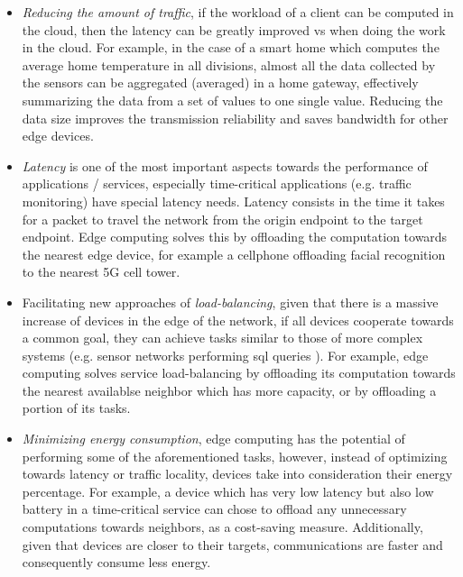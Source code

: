 \begin{itemize}

    \item \textit{Reducing the amount of traffic}, if the workload of a client can be computed in the cloud, then the latency can be greatly improved vs when doing the work in the cloud. For example, in the case of a smart home which computes the average home temperature in all divisions, almost all the data collected by the sensors can be aggregated (averaged) in a home gateway, effectively summarizing the data from a set of values to one single value. Reducing the data size improves the transmission reliability and saves bandwidth for other edge devices.
    
    \item \textit{Latency} is one of the most important aspects towards the performance of applications / services, especially time-critical applications (e.g. traffic monitoring) have special latency needs. Latency consists in the time it takes for a packet to travel the network from the origin endpoint to the target endpoint. Edge computing solves this by offloading the computation towards the nearest edge device, for example a cellphone offloading facial recognition to the nearest 5G cell tower.

    \item Facilitating new approaches of \textit{load-balancing}, given that there is a massive increase of devices in the edge of the network, if all devices cooperate towards a common goal, they can achieve tasks similar to those of more complex systems (e.g. sensor networks performing sql queries \cite{Madden2002}). For example, edge computing solves service load-balancing by offloading its computation towards the nearest availablse neighbor which has more capacity, or by offloading a portion of its tasks.
    
    \item \textit{Minimizing energy consumption}, edge computing has the potential of performing some of the aforementioned tasks, however, instead of optimizing towards latency or traffic locality, devices take into consideration their energy percentage. For example, a device which has very low latency but also low battery in a time-critical service can chose to offload any unnecessary computations towards neighbors, as a cost-saving measure. Additionally, given that devices are closer to their targets, communications are faster and consequently consume less energy.
    
\end{itemize}


